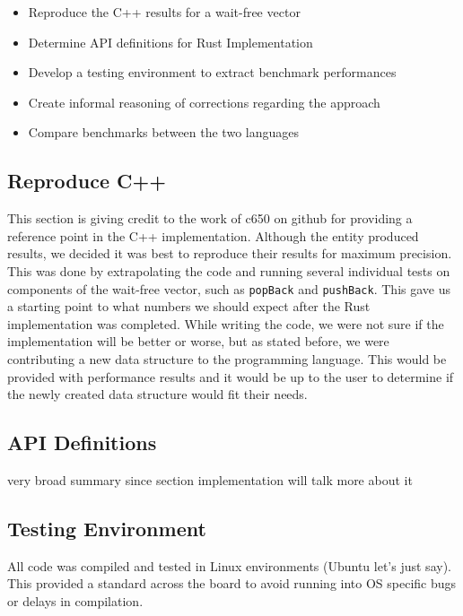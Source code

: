 \documentclass[conference]{IEEEtran}
\begin{document}
    \begin{itemize}
        \item Reproduce the C++ results for a wait-free vector
        \item Determine API definitions for Rust Implementation
        \item Develop a testing environment to extract benchmark performances
        \item Create informal reasoning of corrections regarding the approach
        \item Compare benchmarks between the two languages
    \end{itemize}
    
    \subsection{Reproduce C++}
    
    This section is giving credit to the work of c650 on github for providing a reference point in the C++ implementation. Although the entity produced results, we decided it was best to reproduce their results for maximum precision. This was done by extrapolating the code and running several individual tests on components of the wait-free vector, such as \verb|popBack| and \verb|pushBack|. This gave us a starting point to what numbers we should expect after the Rust implementation was completed. While writing the code, we were not sure if the implementation will be better or worse, but as stated before, we were contributing a new data structure to the programming language. This would be provided with performance results and it would be up to the user to determine if the newly created data structure would fit their needs.

    \subsection{API Definitions}
    
    very broad summary since section {implementation} will talk more about it
    
    \subsection{Testing Environment}
    
    All code was compiled and tested in Linux environments (Ubuntu let's just say). This provided a standard across the board to avoid running into OS specific bugs or delays in compilation. 
\end{document}
